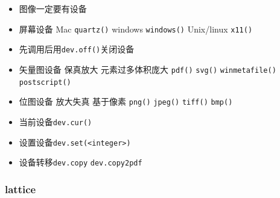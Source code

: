 \documentclass[
]{book}
\providecommand{\tightlist}{%
  \setlength{\itemsep}{0pt}\setlength{\parskip}{0pt}}
\begin{document}
\begin{itemize}
  \begin{itemize}
  \tightlist
  \item
    图像一定要有设备
  \item
    屏幕设备 Mac \texttt{quartz()} windows \texttt{windows()} Unix/linux \texttt{x11()}
  \item
    先调用后用\texttt{dev.off()}关闭设备
  \item
    矢量图设备 保真放大 元素过多体积庞大 \texttt{pdf()} \texttt{svg()} \texttt{winmetafile()} \texttt{postscript()}
  \item
    位图设备 放大失真 基于像素 \texttt{png()} \texttt{jpeg()} \texttt{tiff()} \texttt{bmp()}
  \item
    当前设备\texttt{dev.cur()}
  \item
    设置设备\texttt{dev.set(\textless{}integer\textgreater{})}
  \item
    设备转移\texttt{dev.copy} \texttt{dev.copy2pdf}
  \end{itemize}
\end{itemize}

\hypertarget{lattice}{%
\subsubsection{lattice}\label{lattice}}
\end{document}
